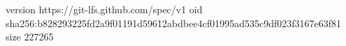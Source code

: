 version https://git-lfs.github.com/spec/v1
oid sha256:b828293225fd2a9f01191d59612abdbee4cf01995ad535c9df023f3167e63f81
size 227265
